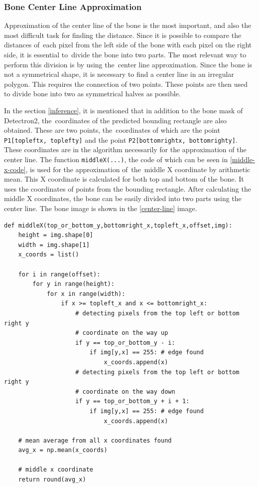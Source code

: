 \subsubsection*{Bone Center Line Approximation}
Approximation of the center line of the bone is the most important, and also the most difficult task for finding the distance. Since it is possible to compare the distances of~each pixel from the left side of the bone with each pixel on the right side, it is essential to~divide the bone into two parts. The most relevant way to perform this division is by using the~center line approximation. Since the bone is not a symmetrical shape, it is necessary to find a center line in an irregular polygon. This requires the connection of two points. These points are then used to divide bone into two as symmetrical halves as possible.

In the section \ref{inference}, it is mentioned that in addition to the bone mask of Detectron2, the~coordinates of the predicted bounding rectangle are also obtained. These are two points, the~coordinates of which are the point \texttt{P1[topleft\textunderscore x, topleft\textunderscore y]} and the point \texttt{P2[bottomright\textunderscore x, bottomright\textunderscore y]}. These coordinates are in the algorithm necessarily for the approximation of the center line. The function \texttt{middleX(...)}, the code of which can be seen in \ref{middle-x-code}, is used for the approximation of~the~middle X coordinate by arithmetic mean. This X coordinate is calculated for both top and bottom of the bone. It uses the coordinates of points from the bounding rectangle. After calculating the middle X coordinates, the bone can be easily divided into two parts using the center line. The bone image is shown in the \ref{center-line} image.

\begin{lstlisting}[label={middle-x-code}, caption={\textbf{Python code function.} Function of middle x coordinate approximation for center line.}]
def middleX(top_or_bottom_y,bottomright_x,topleft_x,offset,img):
    height = img.shape[0]
    width = img.shape[1]
    x_coords = list()

    for i in range(offset):
        for y in range(height):
            for x in range(width):
                if x >= topleft_x and x <= bottomright_x:
                    # detecting pixels from the top left or bottom right y 
                    # coordinate on the way up
                    if y == top_or_bottom_y - i:
                        if img[y,x] == 255: # edge found
                            x_coords.append(x)
                    # detecting pixels from the top left or bottom right y 
                    # coordinate on the way down
                    if y == top_or_bottom_y + i + 1:
                        if img[y,x] == 255: # edge found
                            x_coords.append(x)
                            
    # mean average from all x coordinates found
    avg_x = np.mean(x_coords)
    
    # middle x coordinate
    return round(avg_x) 
\end{lstlisting}

